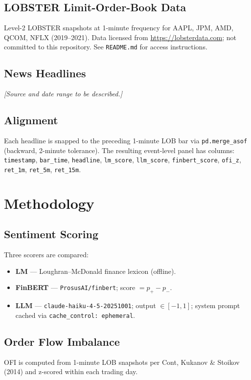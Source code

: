 \documentclass[12pt, letterpaper]{article}
\begin{document}
\subsection{LOBSTER Limit-Order-Book Data}
Level-2 LOBSTER snapshots at 1-minute frequency for
AAPL, JPM, AMD, QCOM, NFLX (2019--2021).
Data licensed from \url{https://lobsterdata.com}; not committed to this
repository.  See \texttt{README.md} for access instructions.

\subsection{News Headlines}
\textit{[Source and date range to be described.]}

\subsection{Alignment}
Each headline is snapped to the preceding 1-minute LOB bar via
\texttt{pd.merge\_asof} (backward, 2-minute tolerance).
The resulting event-level panel has columns:
\texttt{timestamp}, \texttt{bar\_time}, \texttt{headline},
\texttt{lm\_score}, \texttt{llm\_score}, \texttt{finbert\_score},
\texttt{ofi\_z}, \texttt{ret\_1m}, \texttt{ret\_5m}, \texttt{ret\_15m}.


\section{Methodology}
\label{sec:method}

\subsection{Sentiment Scoring}
Three scorers are compared:
\begin{itemize}
  \item \textbf{LM} — Loughran--McDonald finance lexicon (offline).
  \item \textbf{FinBERT} — \texttt{ProsusAI/finbert}; score $= p_+ - p_-$.
  \item \textbf{LLM} — \texttt{claude-haiku-4-5-20251001}; output $\in [-1, 1]$;
        system prompt cached via \texttt{cache\_control: ephemeral}.
\end{itemize}

\subsection{Order Flow Imbalance}
OFI is computed from 1-minute LOB snapshots per Cont, Kukanov \&
Stoikov (2014) and z-scored within each trading day.
\end{document}
